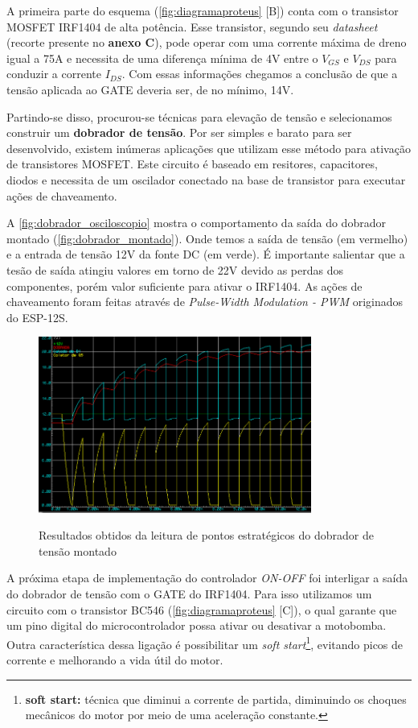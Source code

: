 A primeira parte do esquema (\autoref{fig:diagramaproteus} [B]) conta com o transistor MOSFET  IRF1404 de alta potência. Esse transistor, segundo seu \textit{datasheet} (recorte presente no \textbf{anexo C}), pode operar com uma corrente máxima de dreno igual a 75A e necessita de uma diferença mínima de 4V entre o $V_{GS}$ e $V_{DS}$ para conduzir a corrente $I_{DS}$.
Com essas informações chegamos a conclusão de que a tensão aplicada ao GATE deveria ser, de no mínimo, 14V.

Partindo-se disso, procurou-se técnicas para elevação de tensão e selecionamos construir um \textbf{dobrador de tensão}. Por ser simples e barato para ser desenvolvido, existem inúmeras aplicações que utilizam esse método para ativação de transistores MOSFET. Este circuito é baseado em resitores, capacitores, diodos e necessita de um oscilador conectado na base de transistor para executar ações de chaveamento. 

A \autoref{fig:dobrador_osciloscopio} mostra o comportamento da saída do dobrador montado (\autoref{fig:dobrador_montado}). Onde temos a saída de tensão (em vermelho) e a entrada de tensão 12V da fonte DC (em verde). É importante salientar que a tesão de saída atingiu valores em torno de 22V devido as perdas dos componentes, porém valor suficiente para ativar o IRF1404.
As ações de chaveamento foram feitas através de \textit{Pulse-Width Modulation - PWM} originados do ESP-12S.
\begin{figure}[H]
	\centering
	\caption{Resultados obtidos da leitura de pontos estratégicos do dobrador de tensão montado}
	\includegraphics[width=0.8\textwidth]{figuras/dobrador.png}
	\label{fig:dobrador_osciloscopio}
\end{figure}

A próxima etapa de implementação do controlador \textit{ON-OFF} foi interligar a saída do dobrador de tensão com o GATE do IRF1404. Para isso utilizamos um circuito com o transistor BC546 (\autoref{fig:diagramaproteus} [C]), o qual garante que um pino digital do microcontrolador possa ativar ou desativar a motobomba. Outra característica dessa ligação é possibilitar um \textit{soft start}\footnote{\textbf{soft start:} técnica que diminui a corrente de partida, diminuindo os choques mecânicos do motor por meio de uma aceleração constante.}, evitando picos de corrente e melhorando a vida útil do motor.

